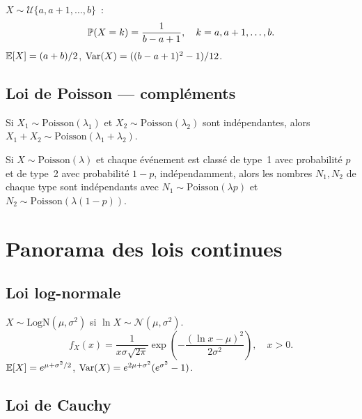 \begin{definition}
$X \sim \mathcal{U}\{a, a+1, \ldots, b\}$~:
\[
    \mathbb{P}(X = k) = \frac{1}{b - a + 1}, \quad k = a, a+1, \ldots, b.
\]
$\mathbb{E}[X] = (a+b)/2$, $\mathrm{Var}(X) = ((b-a+1)^2 - 1)/12$.
\end{definition}

\subsection{Loi de Poisson --- compl\'ements}

\begin{proposition}
Si $X_1 \sim \text{Poisson}(\lambda_1)$ et $X_2 \sim \text{Poisson}(\lambda_2)$
sont ind\'ependantes, alors $X_1 + X_2 \sim \text{Poisson}(\lambda_1 + \lambda_2)$.
\end{proposition}

\begin{proposition}
Si $X \sim \text{Poisson}(\lambda)$ et chaque \'ev\'enement est class\'e de type~1
avec probabilit\'e $p$ et de type~2 avec probabilit\'e $1-p$, ind\'ependamment,
alors les nombres $N_1, N_2$ de chaque type sont ind\'ependants avec
$N_1 \sim \text{Poisson}(\lambda p)$ et $N_2 \sim \text{Poisson}(\lambda(1-p))$.
\end{proposition}

\section{Panorama des lois continues}

\subsection{Loi log-normale}

\begin{definition}
$X \sim \text{LogN}(\mu, \sigma^2)$ si $\ln X \sim \mathcal{N}(\mu, \sigma^2)$.
\[
    f_X(x) = \frac{1}{x\sigma\sqrt{2\pi}}
    \exp\!\left(-\frac{(\ln x - \mu)^2}{2\sigma^2}\right), \quad x > 0.
\]
$\mathbb{E}[X] = e^{\mu + \sigma^2/2}$, $\mathrm{Var}(X) = e^{2\mu+\sigma^2}(e^{\sigma^2}-1)$.
\end{definition}

\subsection{Loi de Cauchy}

